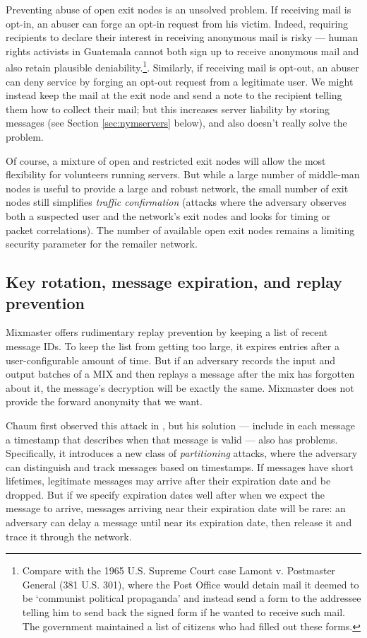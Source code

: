 \documentclass{llncs}
\begin{document}
Preventing abuse of open exit nodes is an unsolved problem. If
receiving mail is opt-in, an abuser can forge an opt-in request from
his victim. Indeed, requiring recipients to declare their interest
in receiving anonymous mail is risky --- human rights activists in
Guatemala cannot both sign up to receive anonymous mail and also retain
plausible deniability.\footnote{
  Compare with the 1965 U.S. Supreme Court case Lamont v. Postmaster
  General (381 U.S. 301), where the Post Office would detain mail it
  deemed to be `communist political propaganda' and instead send a form
  to the addressee telling him to send back the signed form if he wanted
  to receive such mail. The government maintained a list of citizens
  who had filled out these forms.
}. Similarly, if receiving mail is opt-out, an abuser can deny service
by forging an opt-out request from a legitimate user. We might instead
keep the mail at the exit node and send a note to the recipient
telling them how to collect their mail; but this increases
server liability by storing messages (see Section \ref{sec:nymservers}
below), and also doesn't really solve the problem.

Of course, a mixture of open and restricted exit nodes will allow the
most flexibility for volunteers running servers. But while a large number
of middle-man nodes is useful to provide a large and robust network, the
small number of exit nodes still simplifies \emph{traffic confirmation}
(attacks where the adversary observes both a suspected user and the
network's exit nodes and looks for timing or packet correlations). The
number of available open exit nodes remains a limiting security parameter
for the remailer network.

\subsection{Key rotation, message expiration, and replay prevention}

Mixmaster offers rudimentary replay prevention by keeping a list of recent
message IDs. To keep the list from getting too large, it expires entries
after a user-configurable amount of time. But if an adversary records
the input and output batches of a MIX and then replays a message after
the mix has forgotten about it, the message's decryption will be exactly
the same. Mixmaster does not provide the forward anonymity that we want.

Chaum first observed this attack in \cite{chaum-mix}, but his solution
--- include in each message a timestamp that describes when that message
is valid --- also has problems. Specifically, it introduces a new class
of \emph{partitioning} attacks, where the adversary can distinguish and
track messages based on timestamps. If messages have short lifetimes,
legitimate messages may arrive after their expiration date and be
dropped. But if we specify expiration dates well after when we expect the
message to arrive, messages arriving near their expiration date will be
rare: an adversary can delay a message until near its expiration date,
then release it and trace it through the network.
\end{document}
